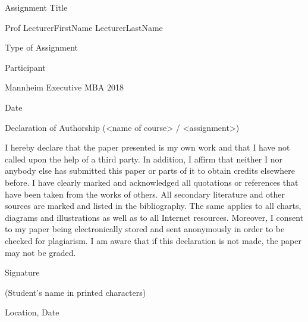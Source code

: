 \documentclass[
    12pt	%
    ]{article}
\begin{document}
  
\begin{titlepage}
\begin{center}

{\Large Assignment Title}
\vspace{1cm}

{
\large Prof LecturerFirstName LecturerLastName
\vspace{2cm}

Type of Assignment
\vspace{1cm}

Participant

Mannheim Executive MBA 2018
\vspace{1cm}


Date
}


\vspace{3cm}

Declaration of Authorship (<name of course> / <assignment>)
\vspace{0.5cm}

I hereby declare that the paper presented is my own work and that I
have not called upon the help of a third party. In addition, I affirm
that neither I nor anybody else has submitted this paper or parts of
it to obtain credits elsewhere before. I have clearly marked and
acknowledged all quotations or references that have been taken from
the works of others. All secondary literature and other sources are
marked and listed in the bibliography. The same applies to all charts,
diagrams and illustrations as well as to all Internet
resources. Moreover, I consent to my paper being electronically stored
and sent anonymously in order to be checked for plagiarism.  I am
aware that if this declaration is not made, the paper may not be
graded.

\vspace{2cm}
Signature

(Student’s name in printed characters)

Location, Date


\end{center}

\end{titlepage}
\end{document}
